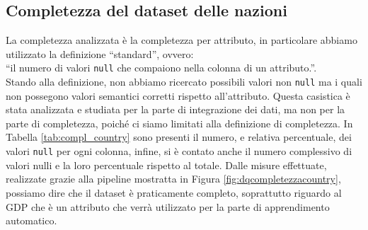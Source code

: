 \subsection{Completezza del dataset delle nazioni}
\label{subsec:compl_country}
La completezza analizzata è la completezza per attributo, in particolare abbiamo utilizzato la definizione “standard”, ovvero:\\“il numero di valori  \texttt{null} che compaiono nella colonna di un attributo.”.\\
Stando alla definizione, non abbiamo ricercato possibili valori non \texttt{null} ma i quali non possegono valori semantici corretti rispetto all'attributo.
Questa casistica è stata analizzata e studiata per la parte di integrazione dei dati, ma non per la parte di completezza, poiché ci siamo limitati alla definizione di completezza. 
In Tabella \ref{tab:compl_country} sono presenti il numero, e relativa percentuale, dei valori \texttt{null} per ogni colonna, infine, si è contato anche il numero complessivo di valori nulli e la loro percentuale rispetto al totale.
Dalle misure effettuate, realizzate grazie alla pipeline mostratta in Figura \ref{fig:dqcompletezzacountry}, possiamo dire che il dataset è praticamente completo, soprattutto riguardo al GDP che è un attributo che verrà utilizzato per la parte di apprendimento automatico.
